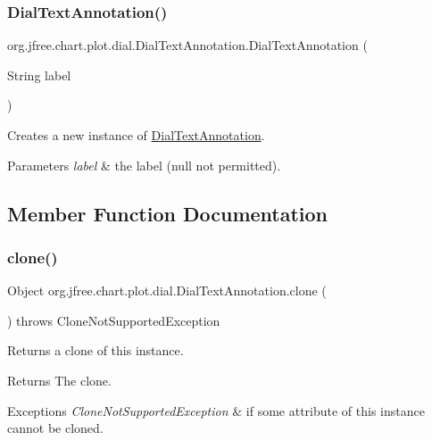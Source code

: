 \subsubsection{\texorpdfstring{Dial\+Text\+Annotation()}{DialTextAnnotation()}}
{\footnotesize\ttfamily org.\+jfree.\+chart.\+plot.\+dial.\+Dial\+Text\+Annotation.\+Dial\+Text\+Annotation (\begin{DoxyParamCaption}\item[{String}]{label }\end{DoxyParamCaption})}

Creates a new instance of {\ttfamily \mbox{\hyperlink{classorg_1_1jfree_1_1chart_1_1plot_1_1dial_1_1_dial_text_annotation}{Dial\+Text\+Annotation}}}.


\begin{DoxyParams}{Parameters}
{\em label} & the label ({\ttfamily null} not permitted). \\
\hline
\end{DoxyParams}


\subsection{Member Function Documentation}
\mbox{\label{classorg_1_1jfree_1_1chart_1_1plot_1_1dial_1_1_dial_text_annotation_ac710cc973493379cdb15957f0a408a3a}} 
\subsubsection{\texorpdfstring{clone()}{clone()}}
{\footnotesize\ttfamily Object org.\+jfree.\+chart.\+plot.\+dial.\+Dial\+Text\+Annotation.\+clone (\begin{DoxyParamCaption}{ }\end{DoxyParamCaption}) throws Clone\+Not\+Supported\+Exception}

Returns a clone of this instance.

\begin{DoxyReturn}{Returns}
The clone.
\end{DoxyReturn}

\begin{DoxyExceptions}{Exceptions}
{\em Clone\+Not\+Supported\+Exception} & if some attribute of this instance cannot be cloned. \\
\hline
\end{DoxyExceptions}
\mbox{\label{classorg_1_1jfree_1_1chart_1_1plot_1_1dial_1_1_dial_text_annotation_af3ff14430a6e7be514a21dbccc1ef7bc}} 
